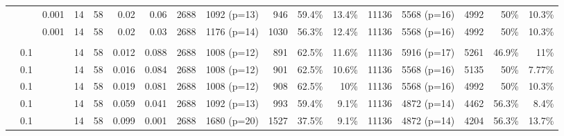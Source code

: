 \begin{landscape}
\begin{table}[p]
\begin{tabular}{|l|rrrrrrrrrrrrrrrr|}
		& \color{red}{0.08} & 0.001 & 14 & 58 & 0.02 & 0.06 & 2688 & 1092 (p=13) & 946 & 59.4\% & 13.4\% & 11136 & 5568 (p=16) & 4992 & 50\% & 10.3\% \\
		
		& \color{red}{0.05} & 0.001 & 14 & 58 & 0.02 & 0.03 & 2688 & 1176 (p=14) & 1030 & 56.3\% & 12.4\% & 11136 & 5568 (p=16) & 4992 & 50\% & 10.3\% \\ 
		
		& & & & & & & & & & & & & & & & \\
		
		& 0.1 & \color{red}{0.0006} & 14 & 58 & 0.012 & 0.088 & 2688 & 1008 (p=12) & 891 & 62.5\% & 11.6\% & 11136 & 5916 (p=17) & 5261 & 46.9\% & 11\% \\
		
		& 0.1 & \color{red}{0.0008} & 14 & 58 & 0.016 & 0.084 & 2688 & 1008 (p=12) & 901 & 62.5\% & 10.6\% & 11136 & 5568 (p=16) & 5135 & 50\% & 7.77\% \\
		
		& 0.1 & \color{red}{0.0010} & 14 & 58 & 0.019 & 0.081 & 2688 & 1008 (p=12) & 908 & 62.5\% & 10\% & 11136 & 5568 (p=16) & 4992 & 50\% & 10.3\% \\
		
		& 0.1 & \color{red}{0.0030} & 14 & 58 & 0.059 & 0.041 & 2688 &  1092 (p=13) & 993 & 59.4\% & 9.1\% & 11136 & 4872 (p=14) & 4462 & 56.3\% & 8.4\% \\
		
		& 0.1 & \color{red}{0.0050} & 14 & 58 & 0.099 & 0.001 & 2688 & 1680 (p=20) & 1527 & 37.5\% & 9.1\% & 11136 & 4872 (p=14) & 4204 & 56.3\% & 13.7\% \\
		

\end{tabular}
\end{table}
\end{landscape}
